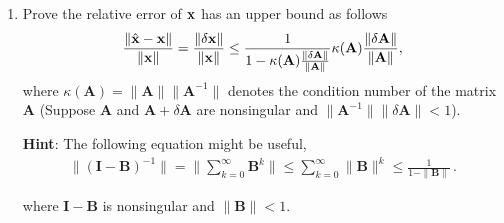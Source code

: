 \documentclass[english,onecolumn]{IEEEtran}
\begin{document}
\begin{enumerate}
    \item Prove the relative error of $\bf{x}$ has an upper bound as follows
    \begin{equation*}
        \frac{\|\hat{\mathbf{x}}-\mathbf{x}\|}{\|\mathbf{x}\|} = \frac{\|\delta \bf{x}\|}{\|\bf{x}\|} \leq \frac{1}{1-\kappa(\mathbf{A})\frac{\|\delta \mathbf{A}\|}{\|\mathbf{A}\|}}\kappa(\mathbf{A})\frac{\|\delta \mathbf{A}\|}{\|\mathbf{A}\|},
    \end{equation*}
    where $\kappa(\mathbf{A}) = \|\mathbf{A}\|\|\mathbf{A}^{-1}\|$ denotes the condition number of the matrix $\mathbf{A}$ (Suppose $\mathbf{A}$ and $\mathbf{A}+\delta \mathbf{A}$ are nonsingular and $\|\mathbf{A}^{-1}\|\|\delta \mathbf{A}\|<1$).
    
    \textbf{Hint}: The following equation might be useful,
    \begin{align*}
        \|(\mathbf{I}-\mathbf{B})^{-1}\| =  \|\sum_{k = 0}^{\infty} \mathbf{B}^k\| \leq \sum_{k = 0}^{\infty} \|\mathbf{B}\|^k \leq  \frac{1}{1-\|\mathbf{B}\|}\,.
    \end{align*}
    
    where $\mathbf{I}-\mathbf{B}$ is nonsingular and $\|\mathbf{B}\| <1$.
    

\end{enumerate}
\end{document}
